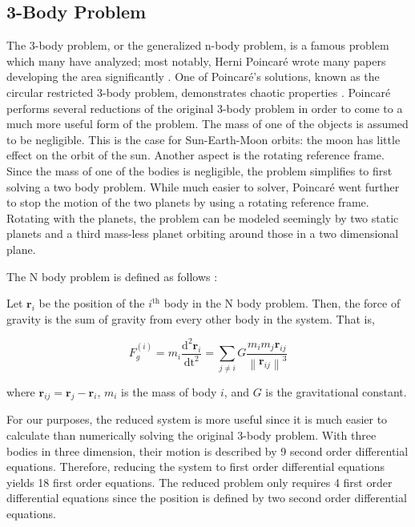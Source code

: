 \documentclass{article}
\begin{document}
\subsection{3-Body Problem}

The 3-body problem, or the generalized n-body problem, is a famous problem
which many have analyzed; most notably, Herni Poincaré wrote many papers
developing the area significantly \cite{chenciner2000remarkable}. One of
Poincaré's solutions, known as the circular restricted 3-body problem,
demonstrates chaotic properties \cite{oestreicher2007history}. Poincaré
performs several reductions of the original 3-body problem in order to come
to a much more useful form of the problem. The mass of one of the objects is
assumed to be negligible. This is the case for Sun-Earth-Moon orbits: the
moon has little effect on the orbit of the sun. Another aspect is the
rotating reference frame. Since the mass of one of the bodies is negligible,
the problem simplifies to first solving a two body problem. While much easier
to solver, Poincaré went further to stop the motion of the two planets by
using a rotating reference frame. Rotating with the planets, the problem can
be modeled seemingly by two static planets and a third mass-less planet
orbiting around those in a two dimensional plane.

\newcommand{\norm}[1]{\left\lVert#1\right\rVert}
\newcommand{\rv}{\mathbf{r}}

The N body problem is defined as follows \cite{chenciner2000remarkable}:

Let $\rv_i$ be the position of the $i^\text{th}$ body in the N body problem.
Then, the force of gravity is the sum of gravity from every other body in the
system. That is,

\begin{equation}
   F_g^{(i)} = m_i \frac{\mathrm{d}^2 \rv_i}{\mathrm{dt}^2} =
   \sum_{j \neq i} G \frac{m_i m_j \hat{\rv}_{ij}}{\norm{\rv_{ij}}^3}
   \label{eq:nbody}
\end{equation}

where $\rv_{ij} = \rv_j - \rv_i$, $m_i$ is the mass of body $i$, and $G$ is
the gravitational constant.

For our purposes, the reduced system is more useful since it is much easier
to calculate than numerically solving the original 3-body problem. With three
bodies in three dimension, their motion is described by 9 second order
differential equations. Therefore, reducing the system to first order
differential equations yields 18 first order equations. The reduced problem
only requires 4 first order differential equations since the position is
defined by two second order differential equations.
\end{document}
